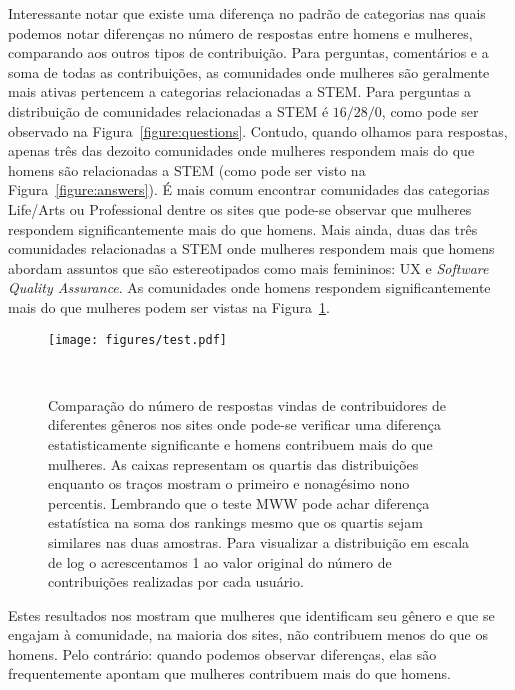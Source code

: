 Interessante notar que existe uma diferença no padrão de categorias nas quais podemos notar diferenças no número de respostas entre homens e mulheres, comparando aos outros tipos de contribuição. Para perguntas, comentários e a soma de todas as contribuições, as comunidades onde mulheres são geralmente mais ativas pertencem a categorias relacionadas a STEM. Para perguntas a distribuição de comunidades relacionadas a STEM é $16/28/0$, como pode ser observado na Figura~\ref{figure:questions}. Contudo, quando olhamos para respostas, apenas três das dezoito comunidades onde mulheres respondem mais do que homens são relacionadas a STEM (como pode ser visto na Figura~\ref{figure:answers}). É mais comum encontrar comunidades das categorias Life/Arts ou Professional dentre os sites que pode-se observar que mulheres respondem significantemente mais do que homens. Mais ainda, duas das três comunidades relacionadas a STEM onde mulheres respondem mais que homens abordam assuntos que são estereotipados como mais femininos: UX e \textit{Software Quality Assurance}. As comunidades onde homens respondem significantemente mais do que mulheres podem ser vistas na Figura~\ref{figure:answers-men}.

\begin{figure}
  \raggedleft
  \texttt{[image: figures/test.pdf]}
  \caption[Comparação do número de respostas em comunidades onde homens respondem mais.]{Comparação do número de respostas vindas de contribuidores de diferentes gêneros nos sites onde pode-se verificar uma diferença estatisticamente significante e homens contribuem mais do que mulheres. As caixas representam os quartis das distribuições enquanto os traços mostram o primeiro e nonagésimo nono percentis. Lembrando que o teste MWW pode achar diferença estatística na soma dos rankings mesmo que os quartis sejam similares nas duas amostras. Para visualizar a distribuição em escala de log o acrescentamos 1 ao valor original do número de contribuições realizadas por cada usuário. }~\label{figure:answers-men}
\end{figure}


Estes resultados nos mostram que mulheres que identificam seu gênero e que se engajam à comunidade, na maioria dos sites, não contribuem menos do que os homens. Pelo contrário: quando podemos observar diferenças, elas são frequentemente apontam que mulheres contribuem mais do que homens.

